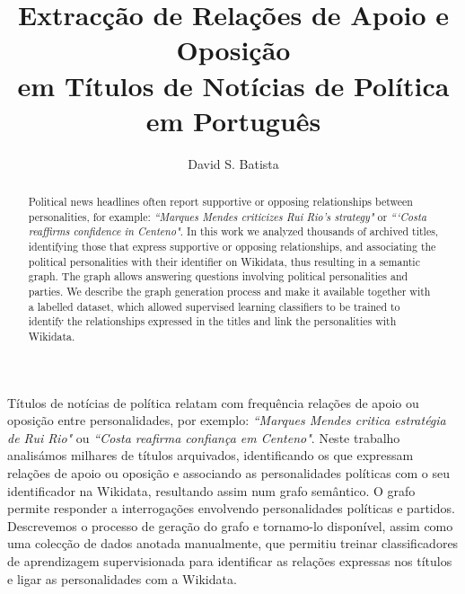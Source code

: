 \documentclass[a4paper, twocolumn, 11pt, twoside]{article}
\title{Extracção de Relações de Apoio e Oposição \\em Títulos de Notícias de Política em Português}
\author{
  David S. Batista \\
  \email{dsbatista@gmail.com} 
}
\begin{document}
\maketitle

\begin{resumo}
	
Títulos de notícias de política relatam com frequência relações de apoio ou oposição entre personalidades, por exemplo: \textit{``Marques Mendes critica estratégia de Rui Rio"} ou \textit{``Costa reafirma confiança em Centeno"}. Neste trabalho analisámos milhares de títulos arquivados, identificando os que expressam relações de apoio ou oposição e associando as personalidades políticas com o seu identificador na Wikidata, resultando assim num grafo semântico. O grafo permite responder a interrogações envolvendo personalidades políticas e partidos. Descrevemos o processo de geração do grafo e tornamo-lo disponível, assim como uma colecção de dados anotada manualmente, que permitiu treinar classificadores de aprendizagem supervisionada para identificar as relações expressas nos títulos e ligar as personalidades com a Wikidata.
\end{resumo}


\begin{abstract}
Political news headlines often report supportive or opposing relationships between personalities, for example: \textit{``Marques Mendes criticizes Rui Rio's strategy"} or \textit{```Costa reaffirms confidence in Centeno"}. In this work we analyzed thousands of archived titles, identifying those that express supportive or opposing relationships, and associating the political personalities with their identifier on Wikidata, thus resulting in a semantic graph. The graph allows answering questions involving political personalities and parties. We describe the graph generation process and make it available together with a labelled dataset, which allowed supervised learning classifiers to be trained to identify the relationships expressed in the titles and link the personalities with Wikidata.
\end{abstract}

\end{document}
